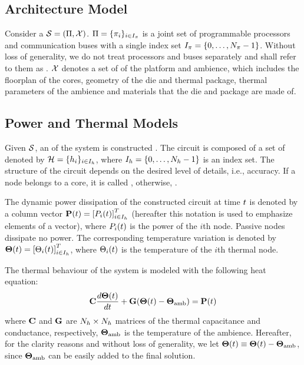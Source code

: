 \subsection{Architecture Model}
Consider a  $\mathcal{S} = (\Pi, \mathcal{X})$. $\Pi = \{ \pi_i \}_{i \in I_\pi}$ is a joint set of programmable processors and communication buses with a single index set $I_\pi = \{0, \dots, N_\pi - 1\}$. Without loss of generality, we do not treat processors and buses separately and shall refer to them as . $\mathcal{X}$ denotes a set of  of the platform and ambience, which includes the floorplan of the cores, geometry of the die and thermal package, thermal parameters of the ambience and materials that the die and package are made of.

\subsection{Power and Thermal Models} 
Given $\mathcal{S}$, an  of the system is constructed \cite{kreith2000}. The circuit is composed of a set of  denoted by $\mathcal{H} = \{ h_i \}_{i \in I_h}$, where $I_h = \{ 0, \dots, N_h - 1 \}$ is an index set. The structure of the circuit depends on the desired level of details, i.e., accuracy. If a node belongs to a core, it is called , otherwise, .

The dynamic power dissipation of the constructed circuit at time $t$ is denoted by a column vector $\mathbf{P}(t) = \left[P_i(t)\right]^T_{i \in I_h}$ (hereafter this notation is used to emphasize elements of a vector), where $P_i(t)$ is the power of the $i$th node. Passive nodes dissipate no power. The corresponding temperature variation is denoted by $\mathbf{\Theta}(t) = \left[\Theta_i(t)\right]^T_{i \in I_h}$, where $\Theta_i(t)$ is the temperature of the $i$th thermal node.

The thermal behaviour of the system is modeled with the following heat equation:
\begin{equation} \equlabel{fourier}
  \mcapacitance \frac{d\vtemperature(\time)}{d\time} + \mconductance (\vtemperature(\time) - \vtemperature_\amb) = \vpower(\time)
\end{equation}
where $\mathbf{C}$ and $\mathbf{G}$ are $N_h \times N_h$ matrices of the thermal capacitance and conductance, respectively, $\mathbf{\Theta}_{\text{amb}}$ is the temperature of the ambience. Hereafter, for the clarity reasons and without loss of generality, we let $\mathbf{\Theta}(t) \equiv \mathbf{\Theta}(t) - \mathbf{\Theta}_{\text{amb}}$, since $\mathbf{\Theta}_{\text{amb}}$ can be easily added to the final solution.

